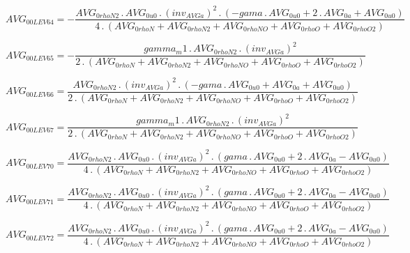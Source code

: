 \documentclass{article}
\begin{document}
\begin{dmath}AVG_{0 0 LEV 64} = - \frac{AVG_{0 rhoN2} \,.\, AVG_{0 u0} \,.\, \left(inv_{AVG a} \right)^{2} \,.\, \left(- gama \,.\, AVG_{0 u0} + 2 \,.\, AVG_{0 a} + AVG_{0 u0}\right)}{4 \,.\, \left(AVG_{0 rhoN} + AVG_{0 rhoN2} + AVG_{0 rhoNO} + 
AVG_{0 rhoO} + AVG_{0 rhoO2}\right)}\end{dmath}

\begin{dmath}AVG_{0 0 LEV 65} = - \frac{gamma_m1 \,.\, AVG_{0 rhoN2} \,.\, \left(inv_{AVG a} \right)^{2}}{2 \,.\, \left(AVG_{0 rhoN} + AVG_{0 rhoN2} + AVG_{0 rhoNO} + AVG_{0 rhoO} + AVG_{0 rhoO2}\right)}\end{dmath}

\begin{dmath}AVG_{0 0 LEV 66} = \frac{AVG_{0 rhoN2} \,.\, \left(inv_{AVG a} \right)^{2} \,.\, \left(- gama \,.\, AVG_{0 u0} + AVG_{0 a} + AVG_{0 u0}\right)}{2 \,.\, \left(AVG_{0 rhoN} + AVG_{0 rhoN2} + AVG_{0 rhoNO} + AVG_{0 rhoO} + AVG_{0 
rhoO2}\right)}\end{dmath}

\begin{dmath}AVG_{0 0 LEV 67} = \frac{gamma_m1 \,.\, AVG_{0 rhoN2} \,.\, \left(inv_{AVG a} \right)^{2}}{2 \,.\, \left(AVG_{0 rhoN} + AVG_{0 rhoN2} + AVG_{0 rhoNO} + AVG_{0 rhoO} + AVG_{0 rhoO2}\right)}\end{dmath}

\begin{dmath}AVG_{0 0 LEV 70} = \frac{AVG_{0 rhoN2} \,.\, AVG_{0 u0} \,.\, \left(inv_{AVG a} \right)^{2} \,.\, \left(gama \,.\, AVG_{0 u0} + 2 \,.\, AVG_{0 a} - AVG_{0 u0}\right)}{4 \,.\, \left(AVG_{0 rhoN} + AVG_{0 rhoN2} + AVG_{0 rhoNO} + AVG_{0 
rhoO} + AVG_{0 rhoO2}\right)}\end{dmath}

\begin{dmath}AVG_{0 0 LEV 71} = \frac{AVG_{0 rhoN2} \,.\, AVG_{0 u0} \,.\, \left(inv_{AVG a} \right)^{2} \,.\, \left(gama \,.\, AVG_{0 u0} + 2 \,.\, AVG_{0 a} - AVG_{0 u0}\right)}{4 \,.\, \left(AVG_{0 rhoN} + AVG_{0 rhoN2} + AVG_{0 rhoNO} + AVG_{0 
rhoO} + AVG_{0 rhoO2}\right)}\end{dmath}

\begin{dmath}AVG_{0 0 LEV 72} = \frac{AVG_{0 rhoN2} \,.\, AVG_{0 u0} \,.\, \left(inv_{AVG a} \right)^{2} \,.\, \left(gama \,.\, AVG_{0 u0} + 2 \,.\, AVG_{0 a} - AVG_{0 u0}\right)}{4 \,.\, \left(AVG_{0 rhoN} + AVG_{0 rhoN2} + AVG_{0 rhoNO} + AVG_{0 
rhoO} + AVG_{0 rhoO2}\right)}\end{dmath}
\end{document}
